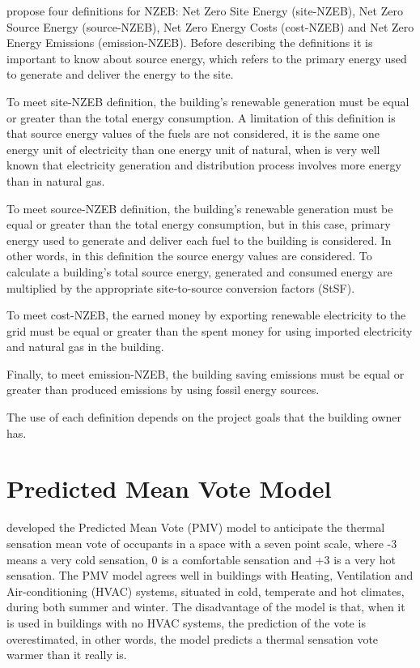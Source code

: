 \citet{torcellini2006zero} propose four definitions for NZEB: Net Zero Site Energy (site-NZEB), Net Zero Source Energy (source-NZEB), Net Zero Energy Costs (cost-NZEB) and Net Zero Energy Emissions (emission-NZEB). Before describing the definitions it is important to know about source energy, which refers to the primary energy used to generate and deliver the energy to the site. 

To meet site-NZEB definition, the building's renewable generation must be equal or greater than the total energy consumption. A limitation of this definition is that source energy values of the fuels are not considered, it is the same one energy unit of electricity than one energy unit of natural, when is very well known that electricity generation and distribution process involves more energy than in natural gas.

To meet source-NZEB definition, the building's renewable generation must be equal or greater than the total energy consumption, but in this case, primary energy used to generate and deliver each fuel to the building is considered. In other words, in this definition the source energy values are considered. To calculate a building's total source energy, generated and consumed energy are multiplied by the appropriate site-to-source conversion factors (StSF). 

To meet cost-NZEB, the earned money by exporting renewable electricity to the grid must be equal or greater than the spent money for using imported electricity and natural gas in the building. 

Finally, to meet emission-NZEB, the building saving emissions must be equal or greater than produced emissions by using fossil energy sources. 

The use of each definition depends on the project goals that the building owner has. 

\section{Predicted Mean Vote Model}

\citet{fanger1970thermal} developed the Predicted Mean Vote (PMV) model to anticipate the thermal sensation mean vote of occupants in a space with a seven point scale, where -3 means a very cold sensation, 0 is a comfortable sensation and +3 is a very hot sensation. The PMV model agrees well in buildings with Heating, Ventilation and Air-conditioning (HVAC) systems, situated in cold, temperate and hot climates, during both summer and winter. The disadvantage of the model is that, when it is used in buildings with no HVAC systems, the prediction of the vote is overestimated, in other words, the model predicts a thermal sensation vote warmer than it really is.

